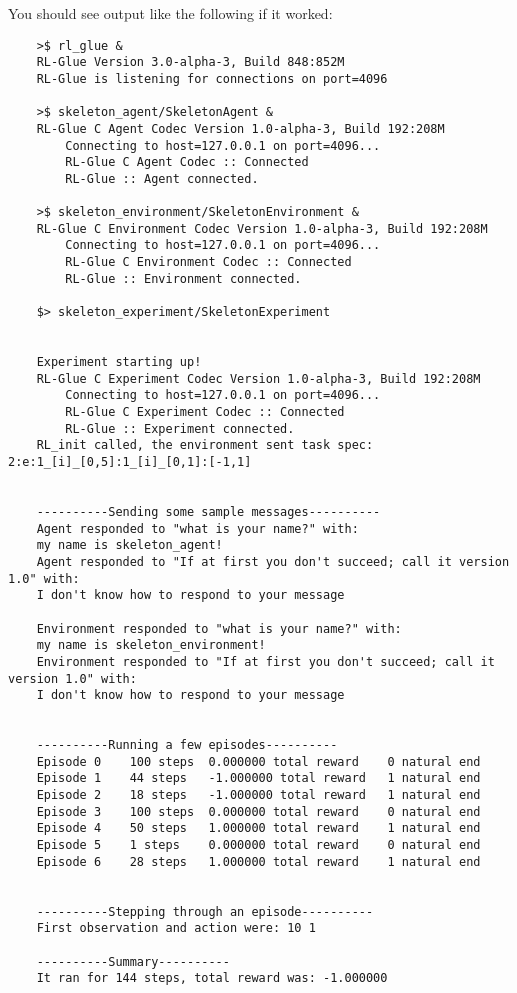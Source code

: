 \documentclass[11pt]{article}
\begin{document}
You should see output like the following if it worked:
\begin{verbatim}
	>$ rl_glue &
	RL-Glue Version 3.0-alpha-3, Build 848:852M
	RL-Glue is listening for connections on port=4096

	>$ skeleton_agent/SkeletonAgent & 
	RL-Glue C Agent Codec Version 1.0-alpha-3, Build 192:208M
		Connecting to host=127.0.0.1 on port=4096...
		RL-Glue C Agent Codec :: Connected
		RL-Glue :: Agent connected.

	>$ skeleton_environment/SkeletonEnvironment & 
	RL-Glue C Environment Codec Version 1.0-alpha-3, Build 192:208M
		Connecting to host=127.0.0.1 on port=4096...
		RL-Glue C Environment Codec :: Connected
		RL-Glue :: Environment connected.

	$> skeleton_experiment/SkeletonExperiment


	Experiment starting up!
	RL-Glue C Experiment Codec Version 1.0-alpha-3, Build 192:208M
		Connecting to host=127.0.0.1 on port=4096...
		RL-Glue C Experiment Codec :: Connected
		RL-Glue :: Experiment connected.
	RL_init called, the environment sent task spec: 2:e:1_[i]_[0,5]:1_[i]_[0,1]:[-1,1]


	----------Sending some sample messages----------
	Agent responded to "what is your name?" with: 
	my name is skeleton_agent!
	Agent responded to "If at first you don't succeed; call it version 1.0" with: 
	I don't know how to respond to your message

	Environment responded to "what is your name?" with: 
	my name is skeleton_environment!
	Environment responded to "If at first you don't succeed; call it version 1.0" with: 
	I don't know how to respond to your message


	----------Running a few episodes----------
	Episode 0	 100 steps 	0.000000 total reward	 0 natural end 
	Episode 1	 44 steps 	-1.000000 total reward	 1 natural end 
	Episode 2	 18 steps 	-1.000000 total reward	 1 natural end 
	Episode 3	 100 steps 	0.000000 total reward	 0 natural end 
	Episode 4	 50 steps 	1.000000 total reward	 1 natural end 
	Episode 5	 1 steps 	0.000000 total reward	 0 natural end 
	Episode 6	 28 steps 	1.000000 total reward	 1 natural end 


	----------Stepping through an episode----------
	First observation and action were: 10 1

	----------Summary----------
	It ran for 144 steps, total reward was: -1.000000
	
\end{verbatim}
\end{document}
